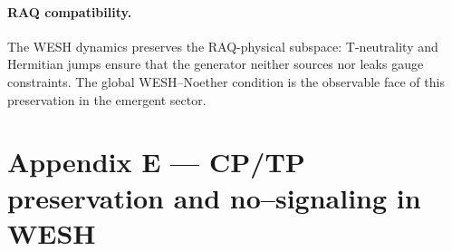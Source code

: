 \documentclass[12pt,a4paper]{article}
\numberwithin{equation}{section}
\begin{document}
\paragraph{RAQ compatibility.}
The WESH dynamics preserves the RAQ-physical subspace: T-neutrality and Hermitian jumps ensure that the generator neither sources nor leaks gauge constraints. The global WESH--Noether condition is the observable face of this preservation in the emergent sector.
\endgroup

\vspace{1cm}

\section*{Appendix E — CP/TP preservation and no–signaling in WESH}
\label{app:CPTP}

\begingroup
\setcounter{equation}{0}
\renewcommand\theequation{E.\arabic{equation}}
\renewcommand{\theHequation}{E.\arabic{equation}}
\setcounter{theorem}{0}
\renewcommand\thetheorem{E.\arabic{theorem}}
\renewcommand{\theHtheorem}{E.\arabic{theorem}}
\setcounter{lemma}{0}
\renewcommand\thelemma{E.\arabic{lemma}}
\renewcommand{\theHlemma}{E.\arabic{lemma}}
\setcounter{remark}{0}
\renewcommand\theremark{E.\arabic{remark}}
\renewcommand{\theHremark}{E.\arabic{remark}}
\setcounter{corollary}{0}
\renewcommand\thecorollary{E.\arabic{corollary}}
\renewcommand{\theHcorollary}{E.\arabic{corollary}}
\setcounter{proposition}{0}
\renewcommand\theproposition{E.\arabic{proposition}}
\renewcommand{\theHproposition}{E.\arabic{proposition}}
\end{document}
